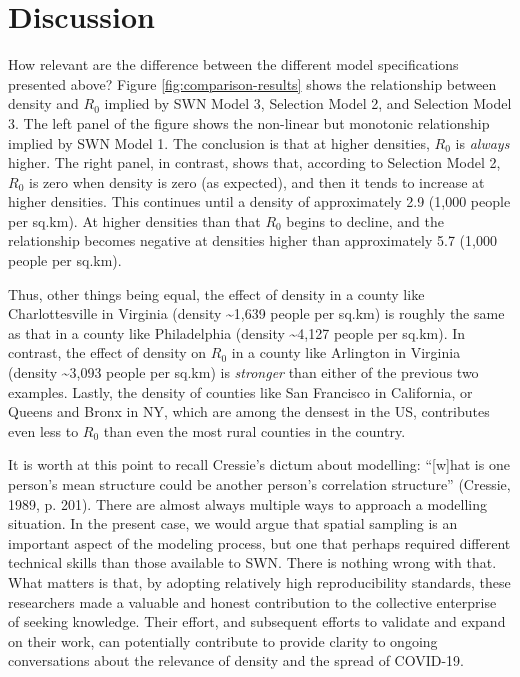 \documentclass[]{elsarticle} %
\begin{document}
\hypertarget{discussion}{%
\section{Discussion}\label{discussion}}

How relevant are the difference between the different model
specifications presented above? Figure \ref{fig:comparison-results}
shows the relationship between density and \(R_0\) implied by SWN Model
3, Selection Model 2, and Selection Model 3. The left panel of the
figure shows the non-linear but monotonic relationship implied by SWN
Model 1. The conclusion is that at higher densities, \(R_0\) is
\emph{always} higher. The right panel, in contrast, shows that,
according to Selection Model 2, \(R_0\) is zero when density is zero (as
expected), and then it tends to increase at higher densities. This
continues until a density of approximately 2.9 (1,000 people per sq.km).
At higher densities than that \(R_0\) begins to decline, and the
relationship becomes negative at densities higher than approximately 5.7
(1,000 people per sq.km).

Thus, other things being equal, the effect of density in a county like
Charlottesville in Virginia (density \textasciitilde1,639 people per
sq.km) is roughly the same as that in a county like Philadelphia
(density \textasciitilde4,127 people per sq.km). In contrast, the effect
of density on \(R_0\) in a county like Arlington in Virginia (density
\textasciitilde3,093 people per sq.km) is \emph{stronger} than either of
the previous two examples. Lastly, the density of counties like San
Francisco in California, or Queens and Bronx in NY, which are among the
densest in the US, contributes even less to \(R_0\) than even the most
rural counties in the country.

It is worth at this point to recall Cressie's dictum about modelling:
``{[}w{]}hat is one person's mean structure could be another person's
correlation structure'' (Cressie, 1989, p. 201). There are almost always
multiple ways to approach a modelling situation. In the present case, we
would argue that spatial sampling is an important aspect of the modeling
process, but one that perhaps required different technical skills than
those available to SWN. There is nothing wrong with that. What matters
is that, by adopting relatively high reproducibility standards, these
researchers made a valuable and honest contribution to the collective
enterprise of seeking knowledge. Their effort, and subsequent efforts to
validate and expand on their work, can potentially contribute to provide
clarity to ongoing conversations about the relevance of density and the
spread of COVID-19.
\end{document}
